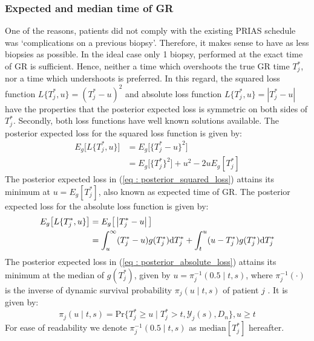 \subsubsection{Expected and median time of GR}
\label{subsubsec : exp_median_fail_time}
One of the reasons, patients did not comply with the existing PRIAS schedule was \textquoteleft complications on a previous biopsy\textquoteright. Therefore, it makes sense to have as less biopsies as possible. In the ideal case only 1 biopsy, performed at the exact time of GR is sufficient. Hence, neither a time which overshoots the true GR time $T^*_j$, nor a time which undershoots is preferred. In this regard, the squared loss function $L\{T^*_j, u\} = (T^*_j - u)^2$ and absolute loss function $L\{T^*_j, u\} = \left|{T^*_j - u}\right|$ have the properties that the posterior expected loss is symmetric on both sides of $T^*_j$. Secondly, both loss functions have well known solutions available. The posterior expected loss for the squared loss function is given by:
\begin{equation}
\label{eq : posterior_squared_loss}
\begin{split}
E_g\big[L\{T^*_j, u\}\big] &= E_g\big[\{T^*_j - u\}^2\big]\\
&=E_g\big[\{T^*_j\}^2\big] + u^2 -2uE_g[T^*_j]
\end{split}
\end{equation}
The posterior expected loss in (\ref{eq : posterior_squared_loss}) attains its minimum at $u = E_g[T^*_j]$, also known as expected time of GR. The posterior expected loss for the absolute loss function is given by:
\begin{equation}
\label{eq : posterior_absolute_loss}
\begin{split}
E_g\big[L\{T^*_j, u\}\big] &= E_g\big[\left|{T^*_j - u}\right|\big]\\
&= \int_u^\infty (T^*_j - u) g(T^*_j)\rmn{d} T^*_j + \int_t^u (u - T^*_j) g(T^*_j)\rmn{d} T^*_j
\end{split}
\end{equation}
The posterior expected loss in (\ref{eq : posterior_absolute_loss}) attains its minimum at the median of $g(T^*_j)$, given by $u = \pi_j^{-1}(0.5 \mid t,s)$, where $\pi_j^{-1}(\cdot)$ is the inverse of dynamic survival probability $\pi_j(u \mid t, s)$ of patient $j$ \citep{rizopoulos2011dynamic}. It is given by:
\begin{equation}
\label{eq : dynamic_surv_prob}
\pi_j(u \mid t, s) = \mbox{Pr}\big\{T^*_j \geq u \mid  T^*_j >t, \mathcal{Y}_j(s), D_n\big\}, u \geq t
\end{equation}
For ease of readability we denote $\pi_j^{-1}(0.5 \mid t,s)$ as $\mbox{median}[T^*_j]$ hereafter.

